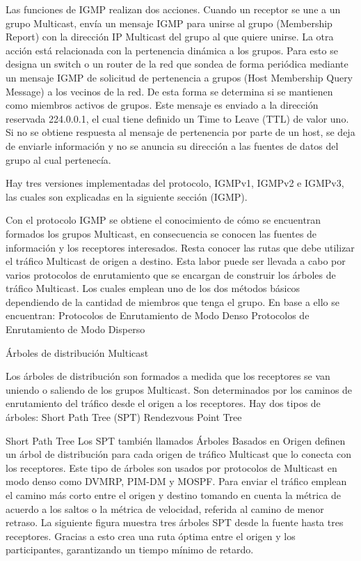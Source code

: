 \documentclass[12pt,a4paper,oneside]{book}
\begin{document}
Las funciones de IGMP realizan dos acciones. Cuando un receptor se une a un grupo Multicast, envía un mensaje IGMP para unirse al grupo (Membership Report) con la dirección IP Multicast del grupo al que quiere unirse.
La otra acción está relacionada con la pertenencia dinámica a los grupos. Para esto se designa un switch o un router de la red que sondea de forma periódica mediante un mensaje IGMP de solicitud de pertenencia a grupos (Host Membership Query Message) a los vecinos de la red. De esta forma se determina si se mantienen como miembros activos de grupos. Este mensaje es enviado a la dirección reservada 224.0.0.1, el cual tiene definido un Time to Leave (TTL) de valor uno. Si no se obtiene respuesta al mensaje de pertenencia por parte de un host, se deja de enviarle información y no se anuncia su dirección a las fuentes de datos del grupo al cual pertenecía. 

Hay tres versiones implementadas del protocolo, IGMPv1, IGMPv2 e IGMPv3, las cuales son explicadas en la siguiente sección (IGMP).

Con el protocolo IGMP se obtiene el conocimiento de cómo se encuentran formados los grupos Multicast, en consecuencia se conocen las fuentes de información y los receptores interesados. Resta conocer las rutas que debe utilizar el tráfico Multicast de origen a destino. Esta labor puede ser llevada a cabo por varios protocolos de enrutamiento que se encargan de construir los árboles de tráfico Multicast. Los cuales emplean  uno de los dos métodos básicos dependiendo de la cantidad de miembros que tenga el grupo. En base a ello se encuentran:
Protocolos de Enrutamiento de Modo Denso
Protocolos de Enrutamiento de Modo Disperso

Árboles de distribución Multicast

	Los árboles de distribución son formados a medida que los receptores se van uniendo o saliendo de los grupos Multicast. Son determinados por los caminos de enrutamiento del tráfico desde el origen a los receptores. 
	Hay dos tipos de árboles:
Short Path Tree (SPT)
Rendezvous Point Tree

	Short Path Tree
	Los SPT también llamados Árboles Basados en Origen definen un árbol de distribución para cada origen de tráfico Multicast que lo conecta con los receptores. Este tipo de árboles son usados por protocolos de Multicast en modo denso como DVMRP, PIM-DM y MOSPF. Para enviar el tráfico emplean el camino más corto entre el origen y destino tomando en cuenta la métrica de acuerdo a los saltos o la métrica de velocidad, referida al camino de menor retraso. La siguiente figura muestra tres árboles SPT desde la fuente hasta tres receptores. Gracias a esto crea una ruta óptima entre el origen y los participantes, garantizando un tiempo mínimo de retardo.
\end{document}
